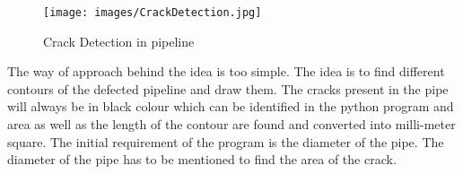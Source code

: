 \begin{figure}[ht]
	\centering
	\texttt{[image: images/CrackDetection.jpg]}
	\caption{Crack Detection in pipeline}
	\label{diag:sample}
\end{figure}

The way of approach behind the idea is too simple. The idea is to find different contours of the defected pipeline and draw them. The cracks present in the pipe will always be in black colour which can be identified in the python program and area as well as the length of the contour are found and converted into milli-meter square. The initial requirement of the program is the diameter of the pipe. The diameter of the pipe has to be mentioned to find the area of the crack.

\clearpage
\newpage